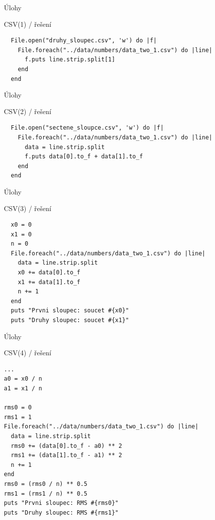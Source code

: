 \documentclass{beamer}
\begin{document}
\begin{frame}[fragile]{Úlohy}
  \begin{block}{CSV(1) / řešení}
    \scriptsize
\begin{verbatim}
  File.open("druhy_sloupec.csv", 'w') do |f|
    File.foreach("../data/numbers/data_two_1.csv") do |line|
      f.puts line.strip.split[1]
    end
  end
\end{verbatim}
  \end{block}
\end{frame}

\begin{frame}[fragile]{Úlohy}
  \begin{block}{CSV(2) / řešení}
    \scriptsize
\begin{verbatim}
  File.open("sectene_sloupce.csv", 'w') do |f|
    File.foreach("../data/numbers/data_two_1.csv") do |line|
      data = line.strip.split
      f.puts data[0].to_f + data[1].to_f
    end
  end
\end{verbatim}
  \end{block}
\end{frame}

\begin{frame}[fragile]{Úlohy}
  \begin{block}{CSV(3) / řešení}
    \scriptsize
\begin{verbatim}
  x0 = 0
  x1 = 0
  n = 0
  File.foreach("../data/numbers/data_two_1.csv") do |line|
    data = line.strip.split
    x0 += data[0].to_f
    x1 += data[1].to_f
    n += 1
  end
  puts "Prvni sloupec: soucet #{x0}"
  puts "Druhy sloupec: soucet #{x1}"
\end{verbatim}
  \end{block}
\end{frame}

\begin{frame}[fragile]{Úlohy}
  \begin{block}{CSV(4) / řešení}
    \scriptsize
\begin{verbatim}
...
a0 = x0 / n
a1 = x1 / n

rms0 = 0
rms1 = 1
File.foreach("../data/numbers/data_two_1.csv") do |line|
  data = line.strip.split
  rms0 += (data[0].to_f - a0) ** 2
  rms1 += (data[1].to_f - a1) ** 2
  n += 1
end
rms0 = (rms0 / n) ** 0.5
rms1 = (rms1 / n) ** 0.5
puts "Prvni sloupec: RMS #{rms0}"
puts "Druhy sloupec: RMS #{rms1}"
\end{verbatim}
  \end{block}
\end{frame}
\end{document}
